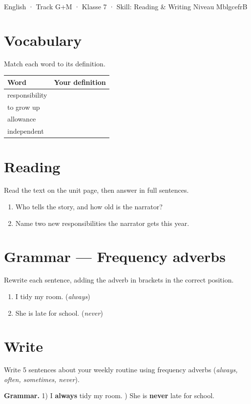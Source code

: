 \documentclass[11pt]{article}
\begin{document}
%
  {English · Track G+M · Klasse 7 · Skill: Reading \& Writing}%
  {Niveau M}{blgcefrB}

\section{Vocabulary}
Match each word to its definition.

\begin{tabularx}{\linewidth}{@{}p{4cm}X@{}}
\toprule
\textbf{Word} & \textbf{Your definition} \\
\midrule
responsibility & \\[0.6em]
to grow up     & \\[0.6em]
allowance      & \\[0.6em]
independent    & \\
\bottomrule
\end{tabularx}

\section{Reading}
Read the text on the unit page, then answer in full sentences.

\begin{enumerate}
  \item Who tells the story, and how old is the narrator?
  \item Name two new responsibilities the narrator gets this year.
\end{enumerate}
\blglines[2]

\section{Grammar — Frequency adverbs}
Rewrite each sentence, adding the adverb in brackets in the correct position.
\begin{enumerate}
  \item I tidy my room. (\textit{always})
  \item She is late for school. (\textit{never})
\end{enumerate}
\blglines[2]

\section{Write}
Write 5 sentences about your weekly routine using frequency adverbs
(\textit{always, often, sometimes, never}).
\blglines[5]

\begin{blganswers}
\textbf{Grammar.} 1) I \textbf{always} tidy my room. ) She is \textbf{never} late for school.
\end{blganswers}
\end{document}
